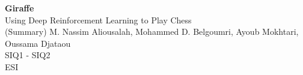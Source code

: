 \documentclass[12pt, a4paper]{article}
\begin{document}
	
\begin{titlepage}
    \begin{center}
        \vspace*{6cm}
        \Huge
        \textbf{Giraffe\\}
        \vspace{1cm}
        \LARGE
        Using Deep Reinforcement Learning to Play Chess\\
		(Summary)
        \vfill
        M. Nassim Aliousalah, Mohammed D. Belgoumri, Ayoub Mokhtari, Oussama Djataou\\
		\vspace{1.5cm}
        \Large
        SIQ1 - SIQ2\\
        ESI\\
    \end{center}
\end{titlepage}
	\newpage
	\vspace*{3cm}
    \tableofcontents
    \newpage
	
	
	
	
\end{document}

